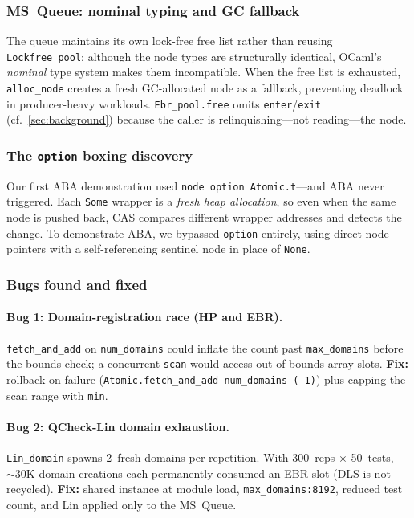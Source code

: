 \documentclass[11pt,a4paper]{article}
\begin{document}
\subsubsection{MS~Queue: nominal typing and GC fallback}

The queue maintains its own lock-free free list rather than reusing
\texttt{Lockfree\_pool}: although the node types are structurally identical,
OCaml's \emph{nominal} type system makes them incompatible.
When the free list is exhausted, \texttt{alloc\_node} creates a fresh
GC-allocated node as a fallback, preventing deadlock in producer-heavy
workloads.  \texttt{Ebr\_pool.free} omits \texttt{enter}/\texttt{exit}
(cf.\ \cref{sec:background}) because the caller is relinquishing---not
reading---the node.

\subsubsection{The \texttt{option} boxing discovery}
\label{sec:option-boxing}

Our first ABA demonstration used \lstinline{node option Atomic.t}---and ABA
never triggered.  Each \lstinline{Some} wrapper is a \emph{fresh heap
allocation}, so even when the same node is pushed back, CAS compares different
wrapper addresses and detects the change.  To demonstrate ABA, we bypassed
\lstinline{option} entirely, using direct node pointers with a self-referencing
sentinel node in place of \lstinline{None}.

\subsubsection{Bugs found and fixed}

\paragraph{Bug 1: Domain-registration race (HP and EBR).}
\texttt{fetch\_and\_add} on \texttt{num\_domains} could inflate the count past
\texttt{max\_domains} before the bounds check; a concurrent \texttt{scan}
would access out-of-bounds array slots.
\textbf{Fix:} rollback on failure
(\lstinline{Atomic.fetch_and_add num_domains (-1)}) plus capping the scan
range with \lstinline{min}.

\paragraph{Bug 2: QCheck-Lin domain exhaustion.}
\texttt{Lin\_domain} spawns 2~fresh domains per repetition.  With 300~reps
$\times$ 50~tests, ${\sim}30$K domain creations each permanently consumed an
EBR slot (DLS is not recycled).
\textbf{Fix:} shared instance at module load, \texttt{max\_domains:8192},
reduced test count, and Lin applied only to the MS~Queue.
\end{document}
